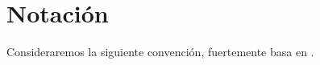 \section*{Notaci\'on}
Consideraremos la siguiente convenci\'on, fuertemente basa en \cite{B:Sip2012}.
